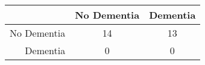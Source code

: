 \begin{table}[ht]
\centering
\begin{tabular}{r|c|c}
  \hline
 & No Dementia & Dementia \\ 
  \hline
No Dementia & 14 & 13 \\ 
  Dementia & 0 & 0 \\ 
   \hline
\end{tabular}
\end{table}
